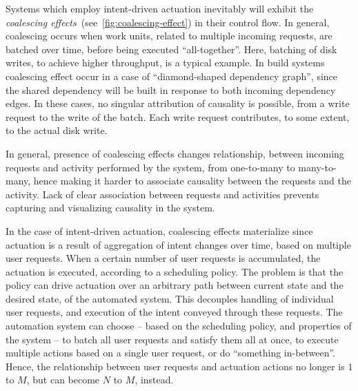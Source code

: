 Systems which employ intent-driven actuation inevitably will exhibit the \textit{coalescing effects}~(see~\cref{fig:coalescing-effect}) in their control flow. In general, coalescing occurs when work units, related to multiple incoming requests, are batched over time, before being executed ``all-together''. Here, batching of disk writes, to achieve higher throughput, is a typical example.  In build systems coalescing effect occur in a case of ``diamond-shaped dependency graph'', since the shared dependency will be built in response to both incoming dependency edges.  In these cases, no singular attribution of causality is possible, from a write request to the write of the batch. Each write request contributes, to some extent, to the actual disk write.

In general, presence of coalescing effects changes relationship, between incoming requests and activity performed by the system, from one-to-many to many-to-many, hence making it harder to associate causality between the requests and the activity. Lack of clear association between requests and activities prevents capturing and visualizing causality in the system.

In the case of intent-driven actuation, coalescing effects materialize since actuation is a result of aggregation of intent changes over time, based on multiple user requests. When a certain number of user requests is accumulated, the actuation is executed, according to a scheduling policy. The problem is that the policy can drive actuation over an arbitrary path between current state and the desired state, of the automated system. This decouples handling of individual user requests, and execution of the intent conveyed through these requests. The automation system can choose -- based on the scheduling policy, and properties of the system -- to batch all user requests and satisfy them all at once, to execute multiple actions based on a single user request, or do ``something in-between''. Hence, the relationship between user requests and actuation actions no longer is $1$ to $M$, but can become $N$ to $M$, instead.

